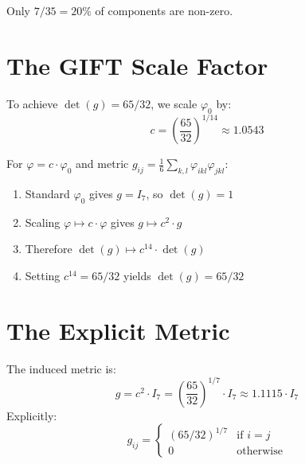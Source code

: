 \begin{theorem}[Sparsity]\label{thm:phi0_sparse}
    \leanok
    Only $7/35 = 20\%$ of components are non-zero.
\end{theorem}

\section{The GIFT Scale Factor}

\begin{definition}\label{def:scale_c}
    \leanok
    To achieve $\det(g) = 65/32$, we scale $\varphi_0$ by:
    \[
        c = \left(\frac{65}{32}\right)^{1/14} \approx 1.0543
    \]
\end{definition}

\begin{theorem}\label{thm:scale_derivation}
    \leanok
    For $\varphi = c \cdot \varphi_0$ and metric $g_{ij} = \frac{1}{6}\sum_{k,l} \varphi_{ikl}\varphi_{jkl}$:
    \begin{enumerate}
        \item Standard $\varphi_0$ gives $g = I_7$, so $\det(g) = 1$
        \item Scaling $\varphi \mapsto c \cdot \varphi$ gives $g \mapsto c^2 \cdot g$
        \item Therefore $\det(g) \mapsto c^{14} \cdot \det(g)$
        \item Setting $c^{14} = 65/32$ yields $\det(g) = 65/32$
    \end{enumerate}
\end{theorem}

\section{The Explicit Metric}

\begin{theorem}\label{thm:metric_form}
    \leanok
    The induced metric is:
    \[
        g = c^2 \cdot I_7 = \left(\frac{65}{32}\right)^{1/7} \cdot I_7 \approx 1.1115 \cdot I_7
    \]
    Explicitly:
    \[
        g_{ij} = \begin{cases}
            (65/32)^{1/7} & \text{if } i = j \\
            0 & \text{otherwise}
        \end{cases}
    \]
\end{theorem}

